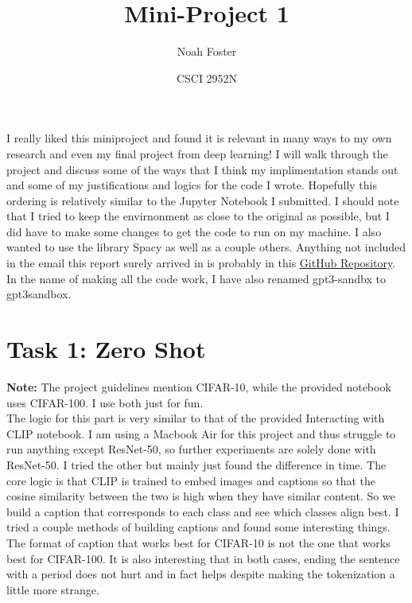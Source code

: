 \documentclass{article}
\title{Mini-Project 1}
\author{Noah Foster}
\date{CSCI 2952N}
\begin{document}
\maketitle

I really liked this miniproject and found it is relevant in many ways to my own research and even my final project from deep learning! I will walk through the project and discuss some of the ways that I think my implimentation stands out and some of my justifications and logics for the code I wrote. Hopefully this ordering is relatively similar to the Jupyter Notebook I submitted. I should note that I tried to keep the envirnonment as close to the original as possible, but I did have to make some changes to get the code to run on my machine. I also wanted to use the library Spacy as well as a couple others. Anything not included in the email this report surely arrived in is probably in this \href{https://github.com/usernamenoahfoster/2952FinalProject}{GitHub Repository}. In the name of making all the code work, I have also renamed gpt3-sandbx to gpt3sandbox. 
\section*{Task 1: Zero Shot}
\textbf{Note:} The project guidelines mention CIFAR-10, while the provided notebook uses CIFAR-100. I use both just for fun.\\

The logic for this part is very similar to that of the provided Interacting with CLIP notebook. I am using a Macbook Air for this project and thus struggle to run anything except ResNet-50, so further experiments are solely done with ResNet-50. I tried the other but mainly just found the difference in time. The core logic is that CLIP is trained to embed images and captions so that the cosine similarity between the two is high when they have similar content. So we build a caption that corresponds to each class and see which classes align best. I tried a couple methods of building captions and found some interesting things. The format of caption that works best for CIFAR-10 is not the one that works best for CIFAR-100. It is also interesting that in both cases, ending the sentence with a period does not hurt and in fact helps despite making the tokenization a little more strange. 
\end{document}
